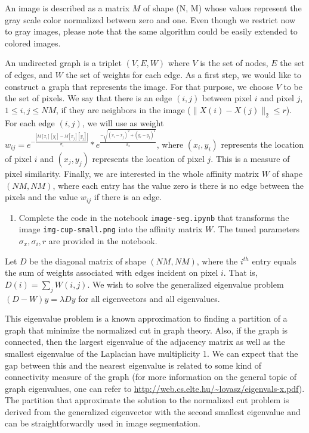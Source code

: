 \documentclass[11pt]{article}
\begin{document}
An image is described as a matrix $M$ of shape (N, M) whose values represent the gray scale color normalized between zero and one. Even though we restrict now to gray images, please note that the same algorithm could be easily extended to colored images.

An undirected graph is a triplet $(V, E, W)$ where $V$ is the set of nodes, $E$ the set of edges, and $W$ the set of weights for each edge. As a first step, we would like to construct a graph that represents the image. For that purpose, we choose $V$ to be the set of pixels. We say that there is an edge $(i, j)$ between pixel $i$ and pixel $j$, $1 \leq i, j \leq NM$, if they are neighbors in the image ($\|X(i) - X(j) \|_2 \leq r$). For each edge $(i, j)$, we will use as weight $w_{ij} = e^{-\frac{|M[x_i][y_i] - M[x_j][y_j]|}{\sigma_i}} * e^{\frac{-\sqrt{(x_i - x_j)^2 + (y_i - y_j)^2}}{\sigma_x}}$, where $(x_i, y_i)$ represents the location of pixel $i$ and $(x_j, y_j)$ represents the location of pixel $j$. This is a measure of pixel similarity. Finally, we are interested in the whole affinity matrix $W$ of shape $(NM, NM)$, where each entry has the value zero is there is no edge between the pixels and the value $w_{ij}$ if there is an edge.

\begin{enumerate}
    \item Complete the code in the notebook \texttt{image-seg.ipynb} that transforms the image \texttt{img-cup-small.png} into the affinity matrix $W$. The tuned parameters $\sigma_x, \sigma_i, r$ are provided in the notebook.
\end{enumerate}

Let $D$ be the diagonal matrix of shape $(NM, NM)$, where the $i^{th}$ entry equals the sum of weights associated with edges incident on pixel $i$. That is, $D(i) = \sum_{j} W(i, j)$. We wish to solve the generalized eigenvalue problem $(D - W)y = \lambda Dy$ for all eigenvectors and all eigenvalues.

This eigenvalue problem is a known approximation to finding a partition of a graph that minimize the normalized cut in graph theory. Also, if the graph is connected, then the largest eigenvalue of the adjacency matrix as well as the smallest eigenvalue of the Laplacian have multiplicity 1. We can expect that the gap between this and the nearest eigenvalue is related to some kind of connectivity measure of the graph (for more information on the general topic of graph eigenvalues, one can refer to \url{http://web.cs.elte.hu/~lovasz/eigenvals-x.pdf}). The partition that approximate the solution to the normalized cut problem is derived from the generalized eigenvector with the second smallest eigenvalue and can be straightforwardly used in image segmentation.
\end{document}
